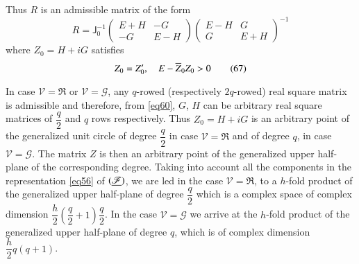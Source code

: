 Thus $R$ is an admissible matrix of the form
\begin{equation*}
R=\mathsf{J}^{-1}_{0}
\begin{pmatrix}
E+H & -G\\
-G & E-H
\end{pmatrix}
\begin{pmatrix}
E-H & G\\
G & E+H
\end{pmatrix}^{-1}\tag{66}\label{eq66}
\end{equation*}
where $Z_{0}=H+iG$ satisfies 
\begin{equation*}
Z_{0}=Z'_{0},\quad E-\overline{Z}_{0}Z_{0}>0\tag{67}\label{eq67}
\end{equation*}

In case $\mathscr{V}=\mathfrak{R}$ or $\mathscr{V}=\mathscr{G}$, any
$q$-rowed (respectively $2q$-rowed) real square matrix is admissible
and therefore, from \eqref{eq60}, $G$, $H$ can be arbitrary real square
matrices of $\dfrac{q}{2}$ and $q$ rows respectively. Thus
$Z_{0}=H+iG$ is an arbitrary point of the generalized unit circle of
degree $\dfrac{q}{2}$ in case $\mathscr{V}=\mathfrak{R}$ and of degree
$q$, in case $\mathscr{V}=\mathscr{G}$. The matrix $Z$ is then an
arbitrary point of the generalized upper half-plane of the
corresponding degree. Taking into account all the components in the
representation \eqref{eq56} of $(\underline{\mathscr{F}})$, we are led in the
case $\mathscr{V}=\mathfrak{R}$, to a $h$-fold product of the
generalized upper half-plane of degree $\dfrac{q}{2}$ which is a
complex space of complex dimension
$\dfrac{h}{2}\left(\dfrac{q}{2}+1\right)\dfrac{q}{2}$. In the case
$\mathscr{V}=\mathscr{G}$ we arrive at the $h$-fold product of the
generalized upper half-plane of degree $q$, which is of complex
dimension $\dfrac{h}{2}q(q+1)$. 

